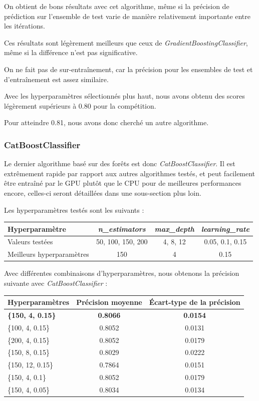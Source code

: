 \documentclass[a4paper]{article}
\begin{document}
    On obtient de bons résultats avec cet algorithme, même si la précision de prédiction sur l'ensemble de test
    varie de manière relativement importante entre les itérations. 
    
    Ces résultats sont légèrement meilleurs que ceux
    de {\it GradientBoostingClassifier}, même si la différence n'est pas significative.

    On ne fait pas de sur-entraînement, car la précision pour les ensembles de test et d'entraînement est assez similaire.

    Avec les hyperparamètres sélectionnés plus haut, nous avons obtenu des scores légèrement supérieurs à 0.80 pour la compétition.

    Pour atteindre 0.81, nous avons donc cherché un autre algorithme.
    
    \subsubsection{CatBoostClassifier}

    Le dernier algorithme basé sur des forêts est donc {\it CatBoostClassifier}. Il est extrêmement rapide par rapport aux autres
    algorithmes testés, et peut facilement être entraîné par le GPU plutôt que le CPU pour de meilleures performances encore,
    celles-ci seront détaillées dans une sous-section plus loin.

    Les hyperparamètres testés sont les suivants :

    \begin{tabular}{| l | *{3}{c|}}
        \hline
        Hyperparamètre & {\it n\_estimators} & {\it max\_depth} & {\it learning\_rate}
        \tabularnewline
        \hline
        Valeurs testées & 50, 100, 150, 200 & 4, 8, 12 & 0.05, 0.1, 0.15
        \tabularnewline
        \hline
        Meilleurs hyperparamètres & 150 & 4 & 0.15
        \tabularnewline
        \hline
    \end{tabular}

    Avec différentes combinaisons d'hyperparamètres, nous obtenons la précision suivante avec {\it CatBoostClassifier} :

    \begin{tabular}{| l | *{2}{c|}}
        \hline
        Hyperparamètres & Précision moyenne & Écart-type de la précision
        \tabularnewline
        \hline
        \textbf{\{150, 4, 0.15\}} & \textbf{0.8066} & \textbf{0.0154} 
        \tabularnewline
        \hline
        \{100, 4, 0.15\} & 0.8052 & 0.0131
        \tabularnewline
        \hline
        \{200, 4, 0.15\} & 0.8052 & 0.0179
        \tabularnewline
        \hline
        \{150, 8, 0.15\} & 0.8029 & 0.0222
        \tabularnewline
        \hline
        \{150, 12, 0.15\} & 0.7864 & 0.0151
        \tabularnewline
        \hline
        \{150, 4, 0.1\} & 0.8052 & 0.0179
        \tabularnewline
        \hline
        \{150, 4, 0.05\} & 0.8034 & 0.0134
        \tabularnewline
        \hline
    \end{tabular}
\end{document}
